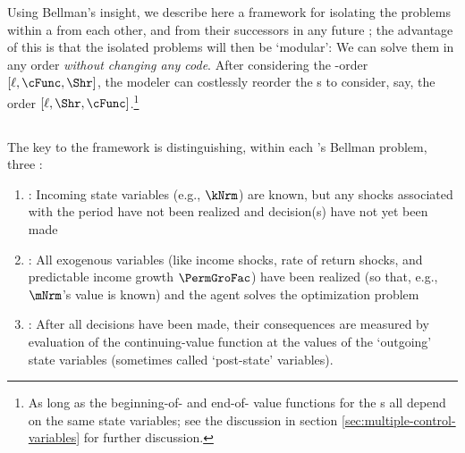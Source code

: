 Using Bellman's insight, we describe here a framework for isolating the {\stg} problems within a {\interval} from each other, and from their successors in any future {\interval}; the advantage of this is that the isolated problems will then be `modular': We can solve them in any order \textit{without changing any code}. After considering the {\stg}-order $[\ell,\cFunc,\Shr]$, the modeler can costlessly reorder the {\stg}s to consider, say, the order $[\ell,\Shr,\cFunc]$.\footnote{As long as the beginning-of-{\stg} and end-of-{\stg} value functions for the {\stg}s all depend on the same state variables; see the discussion in section \ref{sec:multiple-control-variables} for further discussion.}

\subsection{\Moves}

The key to the framework is distinguishing, within each {\stg}'s Bellman problem, three {\moves}:

\begin{enumerate}
\item \textbf{\Arrival}: Incoming state variables (e.g., $\kNrm$) are known, but any shocks associated with the period have not been realized and decision(s) have not yet been made
\item \textbf{\Decision}: All exogenous variables (like income shocks, rate of return shocks, and predictable income growth $\PermGroFac$) have been realized (so that, e.g., $\mNrm$'s value is known) and the agent solves the optimization problem
\item \textbf{\Continuation}: After all decisions have been made, their consequences are measured by evaluation of the continuing-value function at the values of the `outgoing' state variables (sometimes called `post-state' variables).
\end{enumerate}


